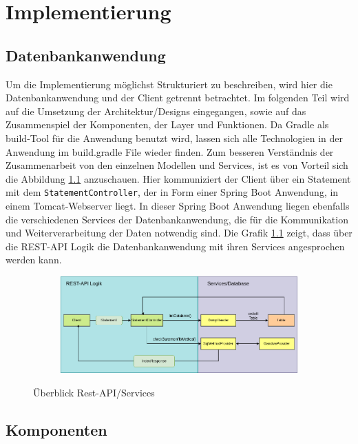 \chapter{Implementierung}
\label{Implementierung}

\section{Datenbankanwendung}

Um die Implementierung möglichst Strukturiert zu beschreiben, wird hier die Datenbankanwendung und der Client getrennt betrachtet.
Im folgenden Teil wird auf die Umsetzung der Architektur/Designs eingegangen, sowie auf das Zusammenspiel der Komponenten, der Layer und Funktionen.
Da Gradle als build-Tool für die Anwendung benutzt wird, lassen sich alle Technologien in der Anwendung im build.gradle File wieder finden. 
Zum besseren Verständnis der Zusammenarbeit von den einzelnen Modellen und Services, ist es von Vorteil sich die Abbildung \ref{graf_3} anzuschauen.
Hier kommuniziert der Client über ein Statement mit dem \texttt{StatementController}, der in Form einer Spring Boot Anwendung, in einem Tomcat-Webserver liegt.
In dieser Spring Boot Anwendung liegen ebenfalls die verschiedenen Services der Datenbankanwendung, die für die Kommunikation und Weiterverarbeitung der Daten notwendig sind. Die Grafik \ref{graf_3} zeigt, dass über die REST-API Logik die Datenbankanwendung mit ihren Services angesprochen werden kann.

\begin{figure}[h]
  \centering
  \begin{subfigure}[b]{1.0\textwidth}
    \includegraphics[width=1.0\linewidth]{img/logic}
  \end{subfigure}
  \caption{Überblick Rest-API/Services}
  \label{graf_3}
\end{figure}

\section{Komponenten}

